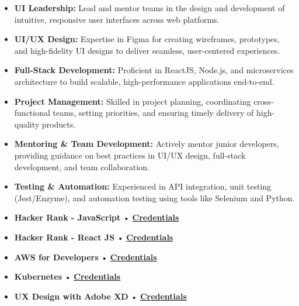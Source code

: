 \begin{itemize}
\item \textbf{UI Leadership:} Lead and mentor teams in the design and development of intuitive, responsive user interfaces across web platforms.
\item \textbf{UI/UX Design:} Expertise in Figma for creating wireframes, prototypes, and high-fidelity UI designs to deliver seamless, user-centered experiences.
\item \textbf{Full-Stack Development:} Proficient in ReactJS, Node.js, and microservices architecture to build scalable, high-performance applications end-to-end.
\item \textbf{Project Management:} Skilled in project planning, coordinating cross-functional teams, setting priorities, and ensuring timely delivery of high-quality products.
\item \textbf{Mentoring \& Team Development:} Actively mentor junior developers, providing guidance on best practices in UI/UX design, full-stack development, and team collaboration.
\item \textbf{Testing \& Automation:} Experienced in API integration, unit testing (Jest/Enzyme), and automation testing using tools like Selenium and Python.
\end{itemize}



\smallskip
\begin{itemize}
\item \textbf{Hacker Rank - JavaScript} { • } \href{https://www.hackerrank.com/certificates/9e1b72fa37a2}{\textbf{Credentials}}
\item \textbf{Hacker Rank - React JS} { • } \href{https://www.hackerrank.com/certificates/6f620b44da51}{\textbf{Credentials}}
\item \textbf{AWS for Developers} { • } \href{https://www.dropbox.com/s/8a2mixx1nuaw0z9/CertificateOfCompletion_Learning%20Amazon%20Web%20Services%20AWS%20for%20Developers.pdf?dl=0}{\textbf{Credentials}}
\item \textbf{Kubernetes} { • } \href{https://www.dropbox.com/s/a0usxfusqvmeg82/CertificateOfCompletion_Learning%20Kubernetes.pdf?dl=0}{\textbf{Credentials}}
\item \textbf{UX Design with Adobe XD} { • } \href{https://www.udemy.com/certificate/UC-8155e0cf-c816-4172-9a82-1516f26752f1/}{\textbf{Credentials}}
\end{itemize}


